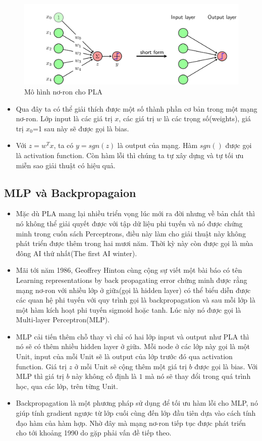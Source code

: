 \begin{figure}[ht]
\centering
        \includegraphics[totalheight=5cm]{Images/first_ann.png}
    \caption{Mô hình nơ-ron cho PLA \cite{basicdeep}}
    \label{pla}
\end{figure}

\begin{itemize}
\item Qua đây ta có thể giải thích được một số thành phần cơ bản trong một mạng nơ-ron. Lớp input là các giá trị $x$, các giá trị $w$ là các trọng số(weights), giá trị $x_{0}$=1 sau này sẽ được gọi là bias.
\item Với $z = w^{T}x$, ta có $y=sgn(z)$ là output của mạng. Hàm $sgn()$ được gọi là activation function.
Còn hàm lỗi thì chúng ta tự xây dựng và tự tối ưu miễn sao giải thuật có hiệu quả.
\end{itemize}
\subsection{MLP và Backpropagaion}
\begin{itemize}
\item Mặc dù PLA mang lại nhiều triển vọng lúc mới ra đời nhưng về bản chất thì nó không thể giải quyết được với tập dữ liệu phi tuyến và nó được chứng minh trong cuốn sách Perceptrons, điều này làm cho giải thuật này không phát triển được thêm trong hai mươi năm. Thời kỳ này còn được gọi là mùa đông AI thứ nhất(The first AI winter).
\item Mãi tới năm 1986, Geoffrey Hinton cùng cộng sự viết một bài báo có tên Learning representations by back propagating error chứng minh được rằng mạng nơ-ron với nhiều lớp ở giữa(gọi là hidden layer) có thể biểu diễn được các quan hệ phi tuyến với quy trình gọi là backpropagation và sau mỗi lớp là một hàm kích hoạt phi tuyến sigmoid hoặc tanh. Lúc này nó được gọi là Multi-layer Perceptron(MLP).
\item MLP cải tiến thêm chỗ thay vì chỉ có hai lớp input và output như PLA thì nó sẽ có thêm nhiều hidden layer ở giữa. Mỗi node ở các lớp này gọi là một Unit, input của mỗi Unit sẽ là output của lớp trước đó qua activation function. Giá trị $z$ ở mỗi Unit sẽ cộng thêm một giá trị $b$ được gọi là bias. Với MLP thì giá trị $b$ này không cố định là $1$ mà nó sẽ thay đổi trong quá trình học, qua các lớp, trên từng Unit.
\item Backpropagation là một phương pháp sử dụng để tối ưu hàm lỗi cho MLP, nó giúp tính gradient ngược từ lớp cuối cùng đến lớp đầu tiên dựa vào cách tính đạo hàm của hàm hợp. Nhờ đây mà mạng nơ-ron tiếp tục được phát triển cho tới khoảng 1990 do gặp phải vấn đề tiếp theo.
\end{itemize}
